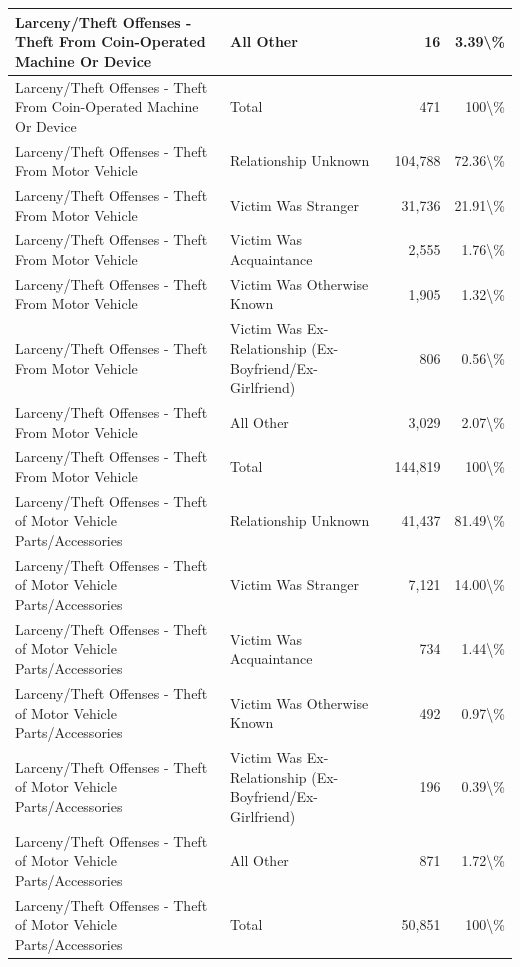 \documentclass[
]{krantz}
\begin{document}
\begin{longtable}[t]{l|l|r|r}
\hline
Larceny/Theft Offenses - Theft From Coin-Operated Machine Or Device & All Other & 16 & 3.39\textbackslash{}\%\\
\hline
Larceny/Theft Offenses - Theft From Coin-Operated Machine Or Device & Total & 471 & 100\textbackslash{}\%\\
\hline
Larceny/Theft Offenses - Theft From Motor Vehicle & Relationship Unknown & 104,788 & 72.36\textbackslash{}\%\\
\hline
Larceny/Theft Offenses - Theft From Motor Vehicle & Victim Was Stranger & 31,736 & 21.91\textbackslash{}\%\\
\hline
Larceny/Theft Offenses - Theft From Motor Vehicle & Victim Was Acquaintance & 2,555 & 1.76\textbackslash{}\%\\
\hline
Larceny/Theft Offenses - Theft From Motor Vehicle & Victim Was Otherwise Known & 1,905 & 1.32\textbackslash{}\%\\
\hline
Larceny/Theft Offenses - Theft From Motor Vehicle & Victim Was Ex-Relationship (Ex-Boyfriend/Ex-Girlfriend) & 806 & 0.56\textbackslash{}\%\\
\hline
Larceny/Theft Offenses - Theft From Motor Vehicle & All Other & 3,029 & 2.07\textbackslash{}\%\\
\hline
Larceny/Theft Offenses - Theft From Motor Vehicle & Total & 144,819 & 100\textbackslash{}\%\\
\hline
Larceny/Theft Offenses - Theft of Motor Vehicle Parts/Accessories & Relationship Unknown & 41,437 & 81.49\textbackslash{}\%\\
\hline
Larceny/Theft Offenses - Theft of Motor Vehicle Parts/Accessories & Victim Was Stranger & 7,121 & 14.00\textbackslash{}\%\\
\hline
Larceny/Theft Offenses - Theft of Motor Vehicle Parts/Accessories & Victim Was Acquaintance & 734 & 1.44\textbackslash{}\%\\
\hline
Larceny/Theft Offenses - Theft of Motor Vehicle Parts/Accessories & Victim Was Otherwise Known & 492 & 0.97\textbackslash{}\%\\
\hline
Larceny/Theft Offenses - Theft of Motor Vehicle Parts/Accessories & Victim Was Ex-Relationship (Ex-Boyfriend/Ex-Girlfriend) & 196 & 0.39\textbackslash{}\%\\
\hline
Larceny/Theft Offenses - Theft of Motor Vehicle Parts/Accessories & All Other & 871 & 1.72\textbackslash{}\%\\
\hline
Larceny/Theft Offenses - Theft of Motor Vehicle Parts/Accessories & Total & 50,851 & 100\textbackslash{}\%\\

\end{longtable}
\end{document}
